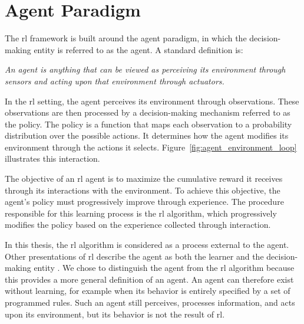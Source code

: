 \section{Agent Paradigm}
\label{sec:reinforcement_learning_agent_paradigm}

The \gls{rl} framework is built around the agent paradigm, in which the decision-making entity is referred to as the agent.
A standard definition is:
\begin{displayquote}
\textit{An agent is anything that can be viewed as perceiving its environment through sensors and acting upon that environment through actuators.} \parencite{russell2021artificial}
\end{displayquote}

In the \gls{rl} setting, the agent perceives its environment through observations.
These observations are then processed by a decision-making mechanism referred to as the policy.
The policy is a function that maps each observation to a probability distribution over the possible actions.
It determines how the agent modifies its environment through the actions it selects.
Figure~\ref{fig:agent_environment_loop} illustrates this interaction.



The objective of an \gls{rl} agent is to maximize the cumulative reward it receives through its interactions with the environment.
To achieve this objective, the agent's policy must progressively improve through experience.
The procedure responsible for this learning process is the \gls{rl} algorithm, which progressively modifies the policy based on the experience collected through interaction.

In this thesis, the \gls{rl} algorithm is considered as a process external to the agent.
Other presentations of \gls{rl} describe the agent as both the learner and the decision-making entity \parencite{sutton2018reinforcement}.
We chose to distinguish the agent from the \gls{rl} algorithm because this provides a more general definition of an agent.
An agent can therefore exist without learning, for example when its behavior is entirely specified by a set of programmed rules.
Such an agent still perceives, processes information, and acts upon its environment, but its behavior is not the result of \gls{rl}.
